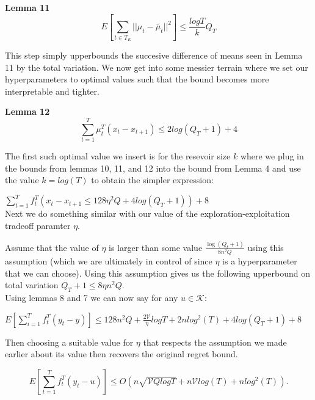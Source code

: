 \textbf{Lemma 11}
\begin{equation}
  E[\sum_{t \in T_E} ||\mu_t - \tilde{\mu_t} ||^2] \leq \frac{log T}{k} Q_T
\end{equation}

This step simply upperbounds the  succesive difference of means seen in  Lemma 11 by the total variation. 
We now get into some messier terrain where we set our hyperparameters to optimal values such that the bound becomes more interpretable and tighter.

\textbf{Lemma 12}
\begin{equation}
  \sum_{t=1}^T \mu_t^T (x_t - x_{t+1}) \leq 2 log(Q_T + 1) + 4
\end{equation}

The first such optimal value we insert is for the resevoir size $k$ where we plug in the bounds from lemmas 10, 11, and 12 into the bound from Lemma 4 and use the value $k=log(T)$ to obtain the simpler expression:

$\sum_{t=1}^T f_t^T (x_t - x_{t+1} \leq 128 \eta^2Q + 4log(Q_T +1))+ 8$ \\

Next we do something similar with our value of the exploration-exploitation tradeoff paramter $\eta$. 

Assume that the value of $\eta$ is larger than some value $\frac{\log(Q_t +1)}{8 n^2 Q}$ using this assumption (which we are ultimately in control of since $\eta$ is a hyperparameter that we can choose). Using this assumption gives us the following upperbound on total variation  $Q_T + 1 \leq 8 \eta n^2 Q$. \\

Using lemmas 8 and 7 we can now say for any $u \in \mathcal{K}$: 

$E[ \sum_{i=1}^T f_t^T (y_t -y) ] \leq 128 n^2Q + \frac{2 \mathcal{V}}{\eta} logT 
+  2 nlog^2(T) + 4log(Q_T +1) + 8 $

Then choosing a suitable value for $\eta$ that respects the assumption we made earlier about its value then recovers the original regret bound.

\begin{equation}
  E[\sum_{t=1}^T f_t^T (y_t - u)] \leq O(n \sqrt{\mathcal{V}Qlog T} + n \mathcal{V} log(T) + nlog^2(T)) . 
\end{equation}
